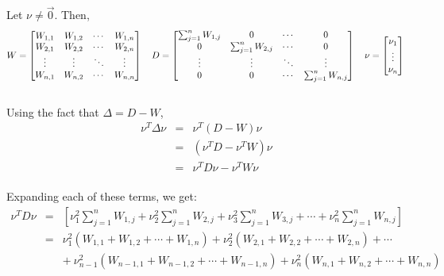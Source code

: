 \documentclass[a4paper]{article}
\begin{document}
Let $\nu \neq \overrightarrow{0}$. Then, \\
$$
W = 
\begin{bmatrix}
     W_{1,1} & W_{1,2} & \cdots & W_{1,n} \\
     W_{2,1} & W_{2,2} & \cdots & W_{2,n} \\
     \vdots  & \vdots  & \ddots & \vdots  \\
     W_{n,1} & W_{n,2} & \cdots & W_{n,n}
\end{bmatrix}\\
\quad
D=
\begin{bmatrix}
     \sum_{j=1}^{n} W_{1,j} & 0 & \cdots & 0 \\
     0 & \sum_{j=1}^{n} W_{2,j} & \cdots & 0 \\
     \vdots & \vdots  & \ddots & \vdots  \\
     0 & 0 & \cdots & \sum_{j=1}^{n} W_{n,j}
\end{bmatrix}\\
\quad
\nu=
\begin{bmatrix}
     \nu_{1} \\
     \vdots \\
     \nu_{n}
\end{bmatrix}\\
$$\\

Using the fact that $\Delta = D-W$, \\
\begin{eqnarray}
  \nu^{T}\Delta \nu & = & \nu^{T} \left(D - W\right)\nu \nonumber \\
  & = & \left(\nu^{T}D - \nu^{T}W\right)\nu \nonumber \\
  & = & \nu^{T}D \nu - \nu^{T}W\nu    \nonumber 
\end{eqnarray}\\

Expanding each of these terms, we get:
\begin{eqnarray}
  \nu^{T}D \nu & = & \left[\nu_{1}^{2}\sum_{j=1}^{n} W_{1,j} +
    \nu_{2}^{2}\sum_{j=1}^{n} W_{2,j} + \nu_{3}^{2}\sum_{j=1}^{n}
    W_{3,j} + \cdots + \nu_{n}^{2}\sum_{j=1}^{n} W_{n,j}\right]
  \nonumber \\ 
  & = & \nu_{1}^{2}\left(W_{1,1} + W_{1,2} + \cdots + W_{1,n}\right) +
  \nu_{2}^{2}\left(W_{2,1} + W_{2,2} + \cdots + W_{2,n}\right) + \cdots
  \nonumber \\ 
  && +\> \nu_{n-1}^{2}\left(W_{n-1,1} + W_{n-1,2} + \cdots +
    W_{n-1,n}\right) + \nu_{n}^{2}\left(W_{n,1} + W_{n,2} + \cdots +
    W_{n,n}\right) \nonumber 
\end{eqnarray}
\end{document}
